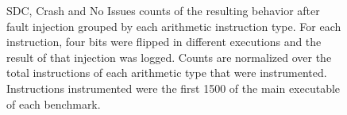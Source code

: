 \documentclass[lettersize,journal]{IEEEtran}
\begin{document}
\begin{figure}[!t] 
    \centering

\caption{SDC, Crash and No Issues counts of the resulting behavior after fault injection grouped by each arithmetic instruction type. For each instruction, four bits were flipped in different executions and the result of that injection was logged. Counts are normalized over the total instructions of each arithmetic type that were instrumented. Instructions instrumented were the first 1500 of the main executable of each benchmark.}
\label{categories}
\end{figure}
\end{document}
